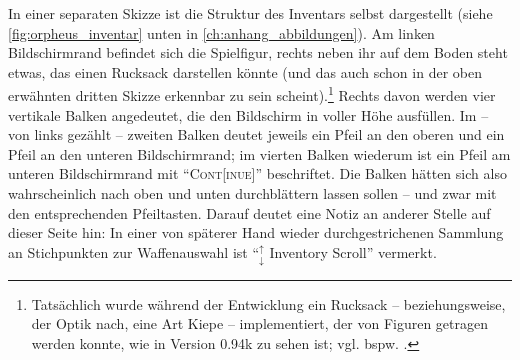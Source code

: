 \documentclass[a5paper,pagesize,numbers=noenddot]{scrbook}
\begin{document}
In einer separaten Skizze ist die Struktur des Inventars selbst dargestellt (siehe \autoref{fig:orpheus_inventar} unten in \autoref{ch:anhang_abbildungen}).
Am linken Bildschirmrand befindet sich die Spielfigur, rechts neben ihr auf dem Boden steht etwas, das einen Rucksack darstellen könnte (und das auch schon in der oben erwähnten dritten Skizze erkennbar zu sein scheint).\footnote{Tatsächlich wurde während der Entwicklung ein Rucksack -- beziehungsweise, der Optik nach, eine Art Kiepe -- implementiert, der von Figuren getragen werden konnte, wie in Version 0.94k zu sehen ist; vgl. bspw. \autocite{alpha_backpack_2023}.}
Rechts davon werden vier vertikale Balken angedeutet, die den Bildschirm in voller Höhe ausfüllen.
Im -- von links gezählt -- zweiten Balken deutet jeweils ein Pfeil an den oberen und ein Pfeil an den unteren Bildschirmrand; im vierten Balken wiederum ist ein Pfeil am unteren Bildschirmrand mit \enquote{\textsc{Cont[inue]}} beschriftet.
Die Balken hätten sich also wahrscheinlich nach oben und unten durchblättern lassen sollen -- und zwar mit den entsprechenden Pfeiltasten.
Darauf deutet eine Notiz an anderer Stelle auf dieser Seite hin:
In einer von späterer Hand wieder durchgestrichenen Sammlung an Stichpunkten zur Waffenauswahl ist \enquote{$_{\downarrow}^{\uparrow}$ Inventory Scroll} vermerkt. %
\end{document}
